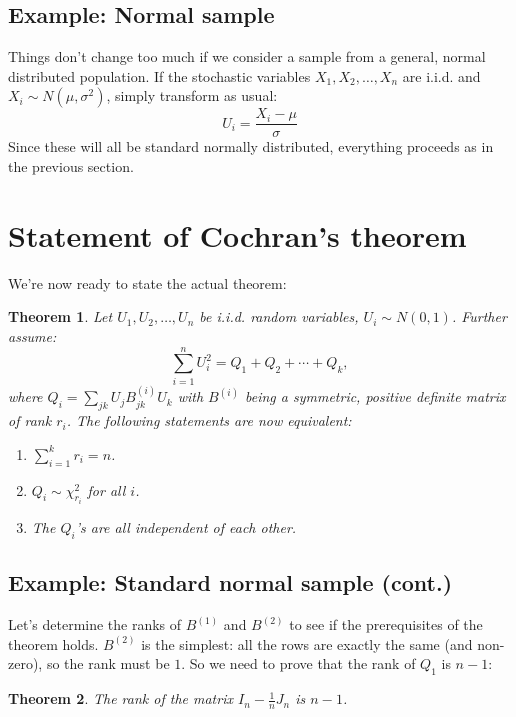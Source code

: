 \documentclass[12pt, a4paper]{article}
\newtheorem{theorem}{Theorem}
\begin{document}
\subsection{Example: Normal sample}
Things don't change too much if we consider a sample from a general, normal distributed population. If the stochastic variables $X_1, X_2, \ldots, X_n$ are i.i.d. and $X_i\sim N(\mu,\sigma^2)$, simply transform as usual:
\begin{equation}
U_i=\frac{X_i-\mu}{\sigma}
\end{equation}
Since these will all be standard normally distributed, everything proceeds as in the previous section.

\section{Statement of Cochran's theorem}
We're now ready to state the actual theorem:
\begin{theorem}
\label{cochran}
Let $U_1, U_2, \ldots , U_n$ be i.i.d. random variables, $U_i\sim N(0,1)$. Further assume:
\begin{equation}
\sum_{i=1}^n U_i^2 = Q_1 + Q_2 + \cdots + Q_k,
\end{equation}
where $Q_i=\sum_{jk}U_j B^{(i)}_{jk}U_k$ with $B^{(i)}$ being a symmetric, positive definite matrix of rank $r_i$. The following statements are now equivalent:
\begin{enumerate}
\item $\sum_{i=1}^k r_i=n$.
\item $Q_i\sim\chi^2_{r_i}$ for all $i$.
\item The $Q_i$'s are all independent of each other.
\end{enumerate}
\end{theorem}

\subsection{Example: Standard normal sample (cont.)}
Let's determine the ranks of $B^{(1)}$ and $B^{(2)}$ to see if the prerequisites of the theorem holds. $B^{(2)}$ is the simplest: all the rows are exactly the same (and non-zero), so the rank must be $1$. So we need to prove that the rank of $Q_1$ is $n-1$:
\begin{theorem}
The rank of the matrix $I_n-\frac{1}{n}J_n$ is $n-1$.
\end{theorem}
\end{document}
